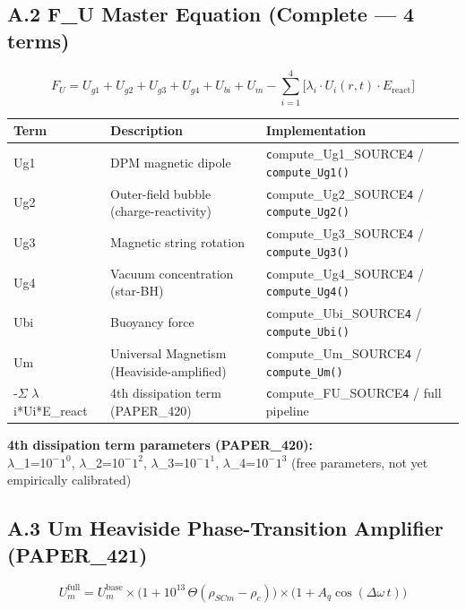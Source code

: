 \documentclass[12pt,a4paper]{article}
\begin{document}
\subsection{A.2 F\_U Master Equation (Complete --- 4 terms)}

\begin{equation}
F_U = U_{g1} + U_{g2} + U_{g3} + U_{g4} + U_{bi} + U_m - \sum_{i=1}^{4}\bigl[\lambda_i \cdot U_i(r,t) \cdot E_{\mathrm{react}}\bigr]
\end{equation}

\begin{table}[H]
\centering
\small
\begin{tabularx}{\linewidth}{@{}>{\raggedright\arraybackslash}X>{\raggedright\arraybackslash}X>{\raggedright\arraybackslash}X@{}}
\toprule
Term & Description & Implementation \tabularnewline
\midrule
Ug1 & DPM magnetic dipole & \texttt{c}ompute\_{Ug1\_SOURCE}\texttt{4} / \texttt{compute\_Ug1()} \tabularnewline
Ug2 & Outer-field bubble (charge-reactivity) & \texttt{c}ompute\_{Ug2\_SOURCE}\texttt{4} / \texttt{compute\_Ug2()} \tabularnewline
Ug3 & Magnetic string rotation & \texttt{c}ompute\_{Ug3\_SOURCE}\texttt{4} / \texttt{compute\_Ug3()} \tabularnewline
Ug4 & Vacuum concentration (star-BH) & \texttt{c}ompute\_{Ug4\_SOURCE}\texttt{4} / \texttt{compute\_Ug4()} \tabularnewline
Ubi & Buoyancy force & \texttt{c}ompute\_{Ubi\_SOURCE}\texttt{4} / \texttt{compute\_Ubi()} \tabularnewline
Um & Universal Magnetism (Heaviside-amplified) & \texttt{c}ompute\_{Um\_SOURCE}\texttt{4} / \texttt{compute\_Um()} \tabularnewline
-$\Sigma$ $\lambda$i*Ui*E\_react & 4th dissipation term (PAPER\_420) & \texttt{c}ompute\_{FU\_SOURCE}\texttt{4} / full pipeline \tabularnewline
\bottomrule
\end{tabularx}
\end{table}

\textbf{4th dissipation term parameters (PAPER\_420):} \\  $\lambda$\_1=1$0^{-}$$1^{0}$, $\lambda$\_2=1$0^{-}$$1^{2}$, $\lambda$\_3=1$0^{-}$$1^{1}$, $\lambda$\_4=1$0^{-}$$1^{3}$ (free parameters, not yet empirically calibrated)

\subsection{A.3 Um Heaviside Phase-Transition Amplifier (PAPER\_421)}

\begin{equation}
U_m^{\mathrm{full}} = U_m^{\mathrm{base}} \times \bigl(1 + 10^{13}\,\Theta(\rho_{SCm} - \rho_c)\bigr) \times \bigl(1 + A_q\cos(\Delta\omega\,t)\bigr)
\end{equation}
\end{document}

